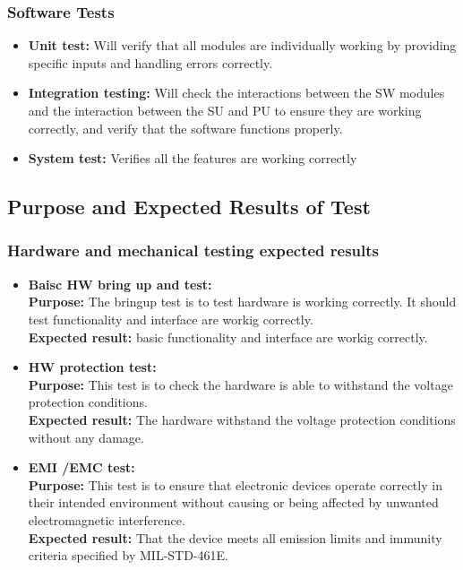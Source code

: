 \documentclass[a4paper,12pt]{article}
\begin{document}
	\subsubsection{Software Tests}
		\begin{itemize}
			\item \textbf{Unit test:}
			Will verify that all modules are individually working by providing specific inputs and handling errors correctly.
			\item \textbf{Integration testing:}
			Will check the interactions between the SW modules and the interaction between the SU and PU to ensure they are working correctly, and verify that the software functions properly.
			\item \textbf{System test:}
			Verifies all the features are working correctly 
		
		\end{itemize}

	 
	\subsection{Purpose and Expected Results of Test}
	
	\subsubsection{Hardware and mechanical testing expected results}

	\begin{itemize}
		\item \textbf{Baisc HW bring up and test: }\\
		\textbf{Purpose:} The bringup test is to test hardware is working correctly. It should test functionality and interface are workig correctly.\\
		\textbf {Expected result:} basic functionality and interface are workig correctly.
		\item \textbf{HW protection test:}\\
		\textbf {Purpose:} This test is to check the hardware is able to withstand the voltage protection conditions.\\
		\textbf {Expected result:} The hardware withstand the voltage protection conditions without any damage. 
		\item \textbf{EMI /EMC test: }\\
		\textbf {Purpose:} This test is to ensure that electronic devices operate correctly in their intended environment without causing or being affected by unwanted electromagnetic interference.\\
		\textbf {Expected result:}  That the device meets all emission limits and immunity criteria specified by MIL-STD-461E. 
		
		
	\end{itemize}
	
\end{document}
